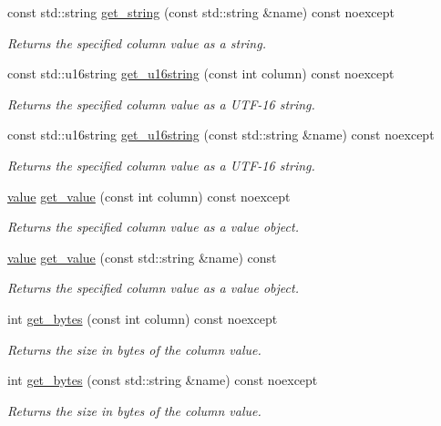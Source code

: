 \begin{DoxyCompactItemize}
const std\-::string \hyperlink{a00010_ab9c842deb81d9eb20388746672a96d29}{get\-\_\-string} (const std\-::string \&name) const noexcept
\begin{DoxyCompactList}\small\item\em Returns the specified column value as a string. \end{DoxyCompactList}\item 
const std\-::u16string \hyperlink{a00010_abfef02b657c992a2d07e28a07e41e533}{get\-\_\-u16string} (const int column) const noexcept
\begin{DoxyCompactList}\small\item\em Returns the specified column value as a U\-T\-F-\/16 string. \end{DoxyCompactList}\item 
const std\-::u16string \hyperlink{a00010_af10d3ff33e5f4ee471bc14cc41ec86c1}{get\-\_\-u16string} (const std\-::string \&name) const noexcept
\begin{DoxyCompactList}\small\item\em Returns the specified column value as a U\-T\-F-\/16 string. \end{DoxyCompactList}\item 
\hyperlink{a00015}{value} \hyperlink{a00010_af776fbdf8dc1150b628b04eca10841f4}{get\-\_\-value} (const int column) const noexcept
\begin{DoxyCompactList}\small\item\em Returns the specified column value as a value object. \end{DoxyCompactList}\item 
\hyperlink{a00015}{value} \hyperlink{a00010_ad7835e8a981450975fee7771fa863ffe}{get\-\_\-value} (const std\-::string \&name) const
\begin{DoxyCompactList}\small\item\em Returns the specified column value as a value object. \end{DoxyCompactList}\item 
int \hyperlink{a00010_ac4404227950aca8d5f01255a5541dbb4}{get\-\_\-bytes} (const int column) const noexcept
\begin{DoxyCompactList}\small\item\em Returns the size in bytes of the column value. \end{DoxyCompactList}\item 
int \hyperlink{a00010_a315b97406b5ba48bcd14857192d88d5e}{get\-\_\-bytes} (const std\-::string \&name) const noexcept
\begin{DoxyCompactList}\small\item\em Returns the size in bytes of the column value. \end{DoxyCompactList}\item 

\end{DoxyCompactItemize}
